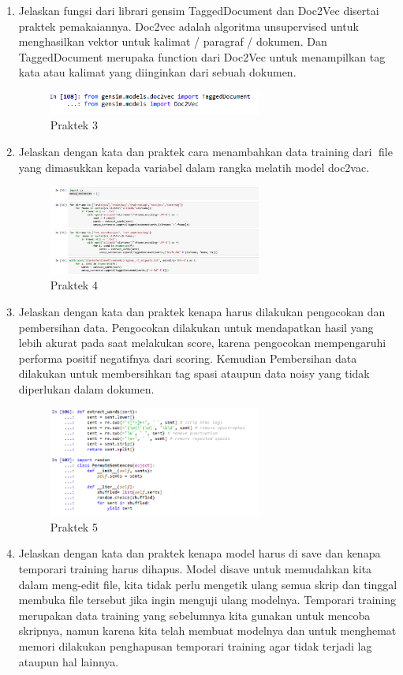 \begin{enumerate}
	\item Jelaskan fungsi dari librari gensim TaggedDocument dan Doc2Vec disertai praktek pemakaiannya.
	\hfill\break
	Doc2vec adalah algoritma unsupervised untuk menghasilkan vektor untuk kalimat / paragraf / dokumen. Dan TaggedDocument merupaka function dari Doc2Vec untuk menampilkan tag kata atau kalimat yang diinginkan dari sebuah dokumen.

		\begin{figure}[H]
			\includegraphics[width=7cm]{figures/1174087/5/22.png}
			\centering
			\caption{Praktek 3}
		\end{figure}
	\item Jelaskan dengan kata dan praktek cara menambahkan data training dari file yang dimasukkan kepada variabel dalam rangka melatih model doc2vac.
	\hfill\break
	
		\begin{figure}[H]
			\includegraphics[width=7cm]{figures/1174087/5/23.png}
			\centering
			\caption{Praktek 4}
		\end{figure}
		
	\item Jelaskan dengan kata dan praktek kenapa harus dilakukan pengocokan dan pembersihan data.
	\hfill\break
	Pengocokan dilakukan untuk mendapatkan hasil yang lebih akurat pada saat melakukan score, karena pengocokan mempengaruhi performa positif negatifnya dari scoring. Kemudian Pembersihan data dilakukan untuk membersihkan tag spasi ataupun data noisy yang tidak diperlukan dalam dokumen. 
		\begin{figure}[H]
			\includegraphics[width=7cm]{figures/1174087/5/24.png}
			\centering
			\caption{Praktek 5}
		\end{figure}
	\item Jelaskan dengan kata dan praktek kenapa model harus di save dan kenapa temporari training harus dihapus.
	\hfill\break
	Model disave untuk memudahkan kita dalam meng-edit ﬁle, kita tidak perlu mengetik ulang semua skrip dan tinggal membuka ﬁle tersebut jika ingin menguji ulang modelnya. Temporari training merupakan data training yang sebelumnya kita gunakan untuk mencoba skripnya, namun karena kita telah membuat modelnya dan untuk menghemat memori dilakukan penghapusan temporari training agar tidak terjadi lag ataupun hal lainnya.
		
			

\end{enumerate}
